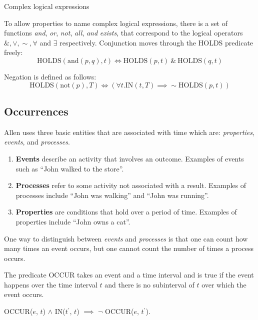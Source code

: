 \begin{exmp} Complex logical expressions

	To allow properties to name complex logical expressions, there is a set of
	functions \textit{and}, \textit{or}, \textit{not}, \textit{all}, \textit{and} \textit{exists}, that correspond to the logical operators
	$\&, \lor, \sim, \forall$ and $\exists$ respectively.
	Conjunction moves through the HOLDS predicate freely:
	\begin{equation}
		\text{HOLDS}(\text{and}(p, q), t) \iff \text{HOLDS}(p, t) \  \& \  \text{HOLDS}(q, t)
	\end{equation}

	Negation is defined as follows:
	\begin{equation}
		\text{HOLDS}(\text{not}(p), T) \iff (\forall t.\text{IN}(t, T) \implies \sim \text{HOLDS}(p, t))
	\end{equation}
\end{exmp}




\subsection{Occurrences}
Allen uses three basic entities that are associated with time which are: \textit{properties}, \textit{events}, and \textit{processes}.
\begin{enumerate}
	\item \textbf{Events} describe an activity that involves an outcome. Examples of events such as ``John walked to the store''.

	\item \textbf{Processes} refer to some activity not associated with a result. Examples of processes include ``John was walking'' and ``John was running''.

	\item \textbf{Properties} are conditions that hold over a period of time. Examples of properties include ``John owns a cat''.
\end{enumerate}
One way to distinguish between \textit{events} and \textit{processes} is that one can count how many times an event occurs, but one cannot count
the number of times a process occurs.


The predicate OCCUR takes an event and a time interval and is true if the event happens over the time interval $t$ and there is no subinterval of $t$
over which the event occurs.

\begin{center}
	OCCUR($e$, $t$) $\land$ IN($t^\prime$, $t$) $\implies$ \(\lnot\) OCCUR($e$, $t^\prime$).
\end{center}

